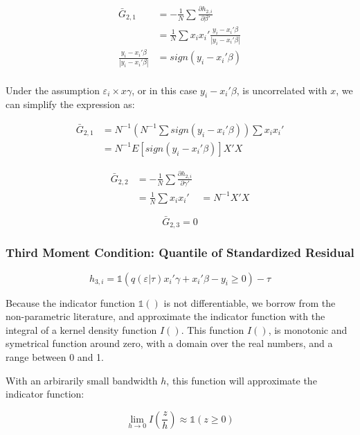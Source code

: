 \documentclass[
  authoryear,
  preprint,
  1p]{elsarticle}
\begin{document}
\[\begin{aligned}
\bar G_{2,1} &= -\frac{1}{N} \sum \frac{\partial h_{2,i}}{\partial \beta'} \\
             &=  \frac{1}{N} \sum x_i x_i' \frac{y_i-x_i'\beta}{|y_i-x_i'\beta|} \\
\frac{y_i-x_i'\beta}{|y_i-x_i'\beta|} &= sign(y_i-x_i'\beta) \\            
\end{aligned}
\]

Under the assumption \(\varepsilon_i \times x\gamma\), or in this case
\(y_i-x_i'\beta\), is uncorrelated with \(x\), we can simplify the
expression as:

\[\begin{aligned}
\bar G_{2,1} &= N^{-1} \left(N^{-1}\sum sign(y_i-x_i'\beta)\right) \sum x_i x_i' \\
&= N^{-1} E[sign(y_i-x_i'\beta)] X'X
\end{aligned}
\]

\[\begin{aligned}
\bar G_{2,2} &= -\frac{1}{N} \sum \frac{\partial h_{2,i}}{\partial \gamma'} \\
             &=  \frac{1}{N} \sum x_i x_i' 
             &= N^{-1} X'X
\end{aligned}
\]

\[\bar G_{2,3}=0\]

\hypertarget{third-moment-condition-quantile-of-standardized-residual}{%
\subsubsection{Third Moment Condition: Quantile of Standardized
Residual}\label{third-moment-condition-quantile-of-standardized-residual}}

\[h_{3,i} = \mathbb{1}\left( q(\varepsilon|\tau) x_i'\gamma +x_i'\beta - y_i \geq 0 \right) - \tau\]

Because the indicator function \(\mathbb{1}()\) is not differentiable,
we borrow from the non-parametric literature, and approximate the
indicator function with the integral of a kernel density function
\(I()\). This function \(I()\), is monotonic and symetrical function
around zero, with a domain over the real numbers, and a range between 0
and 1.

With an arbirarily small bandwidth \(h\), this function will approximate
the indicator function:

\[
\lim_{h\rightarrow 0} I\left(\frac{z}{h}\right) \approx \mathbb{1}(z\geq 0)
\]
\end{document}
